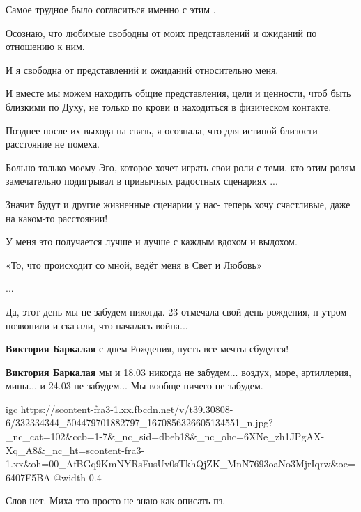 Самое трудное было согласиться именно с этим .

Осознаю, что любимые свободны от моих представлений и ожиданий по отношению к
ним.

И я свободна от представлений и ожиданий относительно меня.

И вместе мы можем находить общие представления, цели и ценности, чтоб быть
близкими по Духу, не только по крови и находиться в физическом контакте.

Позднее после их выхода на связь, я осознала, что для истиной близости
расстояние не помеха.

Больно только моему Эго, которое хочет играть свои роли с теми, кто этим ролям
замечательно подигрывал в привычных радостных сценариях ...

Значит будут и другие жизненные сценарии у нас- теперь хочу счастливые, даже на
каком-то расстоянии!

У меня это получается лучше и лучше с каждым вдохом и выдохом.

«То, что происходит со мной, ведёт меня в Свет и Любовь»

...


Да, этот день мы не забудем никогда. 23 отмечала свой день рождения, п утром
позвонили и сказали, что началась война...

\begin{itemize} %
\textbf{Виктория Баркалая} с днем Рождения, пусть все мечты сбудутся!

\textbf{Виктория Баркалая} мы и 18.03 никогда не забудем... воздух, море, артиллерия, мины... и 24.03 не забудем... Мы вообще ничего не забудем.
\end{itemize} %


\ifcmt
  igc https://scontent-fra3-1.xx.fbcdn.net/v/t39.30808-6/332334344_504479701882797_1670856326605134551_n.jpg?_nc_cat=102&ccb=1-7&_nc_sid=dbeb18&_nc_ohc=6XNe_zh1JPgAX-Xq_A8&_nc_ht=scontent-fra3-1.xx&oh=00_AfBGq9KmNYRsFusUv0sTkhQjZK_MnN7693oaNo3MjrIqrw&oe=6407F5BA
	@width 0.4
\fi


Слов нет. Миха это просто не знаю как описать пз.

